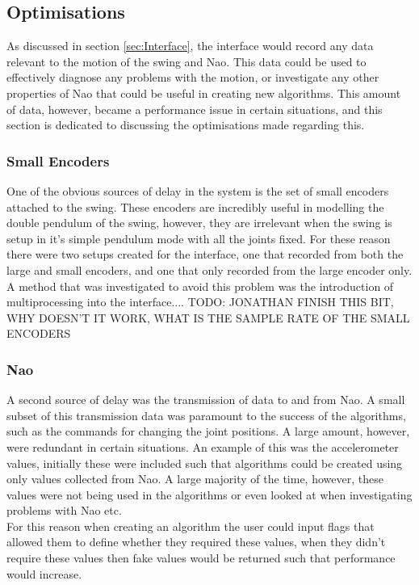 \documentclass[11pt]{article}
\newcommand*\ruleline[1]{\par\noindent\raisebox{.8ex}{\makebox[\linewidth]{\hrulefill\hspace{1ex}\raisebox{-.8ex}{#1}\hspace{1ex}\hrulefill}}}
\begin{document}
\subsection{Optimisations}
As discussed in section \ref{sec:Interface}, the interface would record any data relevant to the motion of the swing and Nao. This data could be used to effectively diagnose any problems with the motion, or investigate any other properties of Nao that could be useful in creating new algorithms. This amount of data, however, became a performance issue in certain situations, and this section is dedicated to discussing the optimisations made regarding this.

\subsubsection{Small Encoders}
\ruleline{Jonathan Matthews}
One of the obvious sources of delay in the system is the set of small encoders attached to the swing. These encoders are incredibly useful in modelling the double pendulum of the swing, however, they are irrelevant when the swing is setup in it's simple pendulum mode with all the joints fixed. For these reason there were two setups created for the interface, one that recorded from both the large and small encoders, and one that only recorded from the large encoder only.\\

A method that was investigated to avoid this problem was the introduction of multiprocessing into the interface....
TODO: JONATHAN FINISH THIS BIT, WHY DOESN'T IT WORK, WHAT IS THE SAMPLE RATE OF THE SMALL ENCODERS

\subsubsection{Nao}
\ruleline{George Sheppard}
A second source of delay was the transmission of data to and from Nao. A small subset of this transmission data was paramount to the success of the algorithms, such as the commands for changing the joint positions. A large amount, however, were redundant in certain situations. An example of this was the accelerometer values, initially these were included such that algorithms could be created using only values collected from Nao. A large majority of the time, however, these values were not being used in the algorithms or even looked at when investigating problems with Nao etc.\\

For this reason when creating an algorithm the user could input flags that allowed them to define whether they required these values, when they didn't require these values then fake values would be returned such that performance would increase.\\
\end{document}
